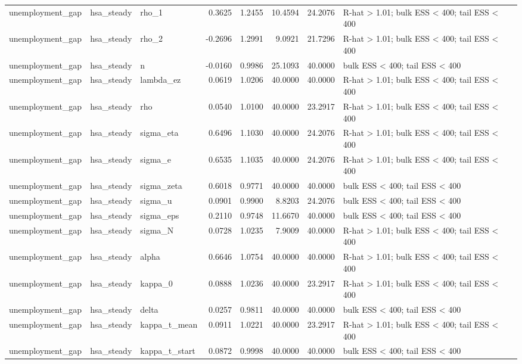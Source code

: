 \begin{tabular}{lllrrrrl}
unemployment\_gap & hsa\_steady & rho\_1 & 0.3625 & 1.2455 & 10.4594 & 24.2076 & R-hat > 1.01; bulk ESS < 400; tail ESS < 400 \\
unemployment\_gap & hsa\_steady & rho\_2 & -0.2696 & 1.2991 & 9.0921 & 21.7296 & R-hat > 1.01; bulk ESS < 400; tail ESS < 400 \\
unemployment\_gap & hsa\_steady & n & -0.0160 & 0.9986 & 25.1093 & 40.0000 & bulk ESS < 400; tail ESS < 400 \\
unemployment\_gap & hsa\_steady & lambda\_ez & 0.0619 & 1.0206 & 40.0000 & 40.0000 & R-hat > 1.01; bulk ESS < 400; tail ESS < 400 \\
unemployment\_gap & hsa\_steady & rho & 0.0540 & 1.0100 & 40.0000 & 23.2917 & R-hat > 1.01; bulk ESS < 400; tail ESS < 400 \\
unemployment\_gap & hsa\_steady & sigma\_eta & 0.6496 & 1.1030 & 40.0000 & 24.2076 & R-hat > 1.01; bulk ESS < 400; tail ESS < 400 \\
unemployment\_gap & hsa\_steady & sigma\_e & 0.6535 & 1.1035 & 40.0000 & 24.2076 & R-hat > 1.01; bulk ESS < 400; tail ESS < 400 \\
unemployment\_gap & hsa\_steady & sigma\_zeta & 0.6018 & 0.9771 & 40.0000 & 40.0000 & bulk ESS < 400; tail ESS < 400 \\
unemployment\_gap & hsa\_steady & sigma\_u & 0.0901 & 0.9900 & 8.8203 & 24.2076 & bulk ESS < 400; tail ESS < 400 \\
unemployment\_gap & hsa\_steady & sigma\_eps & 0.2110 & 0.9748 & 11.6670 & 40.0000 & bulk ESS < 400; tail ESS < 400 \\
unemployment\_gap & hsa\_steady & sigma\_N & 0.0728 & 1.0235 & 7.9009 & 40.0000 & R-hat > 1.01; bulk ESS < 400; tail ESS < 400 \\
unemployment\_gap & hsa\_steady & alpha & 0.6646 & 1.0754 & 40.0000 & 40.0000 & R-hat > 1.01; bulk ESS < 400; tail ESS < 400 \\
unemployment\_gap & hsa\_steady & kappa\_0 & 0.0888 & 1.0236 & 40.0000 & 23.2917 & R-hat > 1.01; bulk ESS < 400; tail ESS < 400 \\
unemployment\_gap & hsa\_steady & delta & 0.0257 & 0.9811 & 40.0000 & 40.0000 & bulk ESS < 400; tail ESS < 400 \\
unemployment\_gap & hsa\_steady & kappa\_t\_mean & 0.0911 & 1.0221 & 40.0000 & 23.2917 & R-hat > 1.01; bulk ESS < 400; tail ESS < 400 \\
unemployment\_gap & hsa\_steady & kappa\_t\_start & 0.0872 & 0.9998 & 40.0000 & 40.0000 & bulk ESS < 400; tail ESS < 400 \\

\end{tabular}
